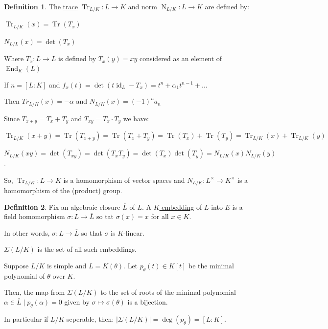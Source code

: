 \documentclass[openany]{amsbook}
\numberwithin{section}{chapter}
\theoremstyle{definition}
\newtheorem*{definition}{Definition}
\newcommand{\Tr}{\operatorname{Tr}}
\newcommand{\N}{\operatorname{N}}
\newcommand{\End}{\operatorname{End}}
\begin{document}
\begin{definition}
    The \underline{trace} \(\operatorname{Tr}_{L / K} : L \to K \) and norm \(\N_{L / K}: L \to K\) are defined by:
    
        \(\Tr_{L / K}(x) = \Tr(T_x)\) 
        
        \(N_{L / L}(x) = \det (T_x)\) 

    Where \(T_x : L \to L\) is defined by \(T_x(y) = xy\) considered as an element of \(\End_K(L)\) 
\end{definition}

If \(n = [L : K]\) and \(f_x(t) = \det (t \operatorname{id}_L - T_x) = t^n + \alpha_1 t^{n-1} + \dots \) 

Then \(Tr _{L / K}(x) = -\alpha\) and \(N_{L / K}(x) = (-1)^n a_n\) 

Since \(T_{x+y} = T_x + T_y\) and \(T_{xy} = T_x \cdot T_y\) we have:

\(\Tr_{L / K}(x + y) = \Tr(T_{x+y}) = \Tr(T_x + T_y) = \Tr(T_x)+\Tr(T_y)=\Tr_{L / K}(x)+\Tr_{L / K}(y)\) 

\(N_{L / K}(xy) = \det(T_{xy})=\det(T_x T_y)=\det(T_x)\det(T_y)=N_{L / K}(x) N_{L / K}(y)\).

So, \(\Tr_{L / K}:L \to K\) is a homomorphism of vector spaces and \(N_{L / K}:L^\times \to K^\times\) is a homomorphism of the (product) group.

\begin{definition}
    Fix an algebraic closure \(\overline{L} \) of \(L\). A \underline{\(K\)-embedding} of \(L\) into \(E\) is a field homomorphism \(\sigma : L \to \overline{L}\) so tat \(\sigma(x) = x\) for all \(x\in K\).

    In other words, \(\sigma : L \to \overline{L} \) so that \(\sigma\) is \(K\)-linear.

    \(\Sigma (L / K)\) is the set of all such embeddings.
\end{definition}

Suppose \(L / K\) is simple and \(L = K(\theta)\). Let \(p_\theta (t)\in K[t]\) be the minimal polynomial of \(\theta\) over \(K\).

Then, the map from \(\Sigma (L / K)\) to the set of roots of the minimal polynomial \(\alpha \in \overline{L} \mid p_\theta (\alpha) = 0\) given by \(\sigma \mapsto \sigma(\theta)\) is a bijection.

In particular if \(L / K\) seperable, then: \(\vert \Sigma (L / K) \vert = \deg(p_{\theta})=[L : K]\).
\end{document}
